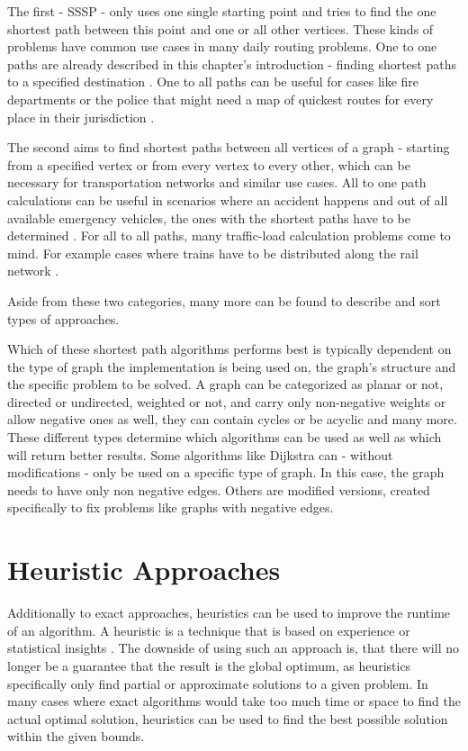 The first  - SSSP - only uses one single starting point and tries to find the one shortest path between this point and one or all other vertices.
These kinds of problems have common use cases in many daily routing problems. 
One to one paths are already described in this chapter's introduction - finding shortest paths to a specified destination \cite{sanders_shortest_2019}.
One to all paths can be useful for cases like fire departments or the police that might need a map of quickest routes for every place in their jurisdiction \cite{sanders_shortest_2019}.

The second aims to find shortest paths between all vertices of a graph - starting from a specified vertex or from every vertex to every other, which can be necessary for transportation networks and similar use cases. 
All to one path calculations can be useful in scenarios where an accident happens and out of all available emergency vehicles, the ones with the shortest paths have to be determined \cite{khamayseh_efficient_2015}.
For all to all paths, many traffic-load calculation problems come to mind. 
For example cases where trains have to be distributed along the rail network \cite{curtis_rewire_2012}.


Aside from these two categories, many more can be found to describe and sort types of approaches. 


Which of these shortest path algorithms performs best is typically dependent on the type of graph the implementation is being used on, the graph's structure and the specific problem to be solved. 
A graph can be categorized as planar or not, directed or undirected, weighted or not, and carry only non-negative weights or allow negative ones as well, they can contain cycles or be acyclic and many more. 
These different types determine which algorithms can be used as well as which will return better results.
Some algorithms like Dijkstra can - without modifications - only be used on a specific type of graph. 
In this case, the graph needs to have only non negative edges.
Others are modified versions, created specifically to fix problems like graphs with negative edges. 


\section{Heuristic Approaches}
\label{sec:metaHeuristics}

Additionally to exact approaches, heuristics can be used to improve the runtime of an algorithm.
A heuristic is a technique that is based on experience or statistical insights \cite{gendreau_handbook_2010}.
The downside of using such an approach is, that there will no longer be a guarantee that the result is the global optimum, as heuristics specifically only find partial or approximate solutions to a given problem. 
In many cases where exact algorithms would take too much time or space to find the actual optimal solution, heuristics can be used to find the best possible solution within the given bounds.

